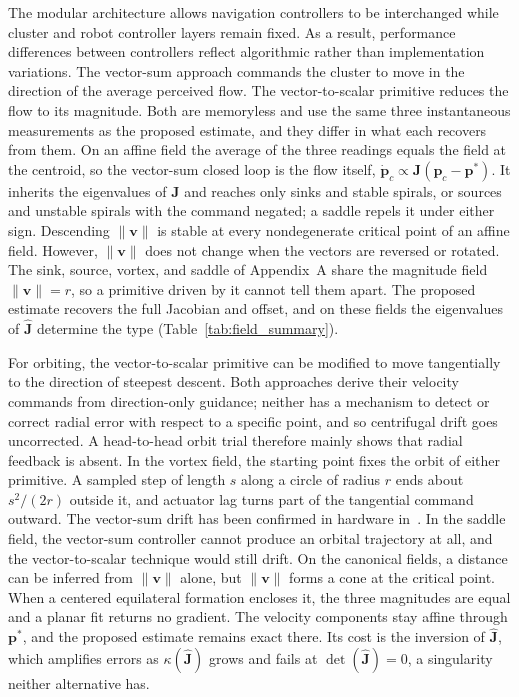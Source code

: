 The modular architecture allows navigation controllers to be interchanged while cluster and robot controller layers remain fixed. As a result, performance differences between controllers reflect algorithmic rather than implementation variations. The vector-sum approach commands the cluster to move in the direction of the average perceived flow. The vector-to-scalar primitive \cite{48} reduces the flow to its magnitude. Both are memoryless and use the same three instantaneous measurements as the proposed estimate, and they differ in what each recovers from them. On an affine field the average of the three readings equals the field at the centroid, so the vector-sum closed loop is the flow itself, $\dot{\mathbf{p}}_c \propto \mathbf{J}(\mathbf{p}_c - \mathbf{p}^*)$. It inherits the eigenvalues of $\mathbf{J}$ and reaches only sinks and stable spirals, or sources and unstable spirals with the command negated; a saddle repels it under either sign. Descending $\|\mathbf{v}\|$ is stable at every nondegenerate critical point of an affine field. However, $\|\mathbf{v}\|$ does not change when the vectors are reversed or rotated. The sink, source, vortex, and saddle of Appendix~A share the magnitude field $\|\mathbf{v}\| = r$, so a primitive driven by it cannot tell them apart. The proposed estimate recovers the full Jacobian and offset, and on these fields the eigenvalues of $\hat{\mathbf{J}}$ determine the type (Table~\ref{tab:field_summary}).

For orbiting, the vector-to-scalar primitive can be modified to move tangentially to the direction of steepest descent. Both approaches derive their velocity commands from direction-only guidance; neither has a mechanism to detect or correct radial error with respect to a specific point, and so centrifugal drift goes uncorrected. A head-to-head orbit trial therefore mainly shows that radial feedback is absent. In the vortex field, the starting point fixes the orbit of either primitive. A sampled step of length $s$ along a circle of radius $r$ ends about $s^2/(2r)$ outside it, and actuator lag turns part of the tangential command outward. The vector-sum drift has been confirmed in hardware in~\cite{22}. In the saddle field, the vector-sum controller cannot produce an orbital trajectory at all, and the vector-to-scalar technique would still drift. On the canonical fields, a distance can be inferred from $\|\mathbf{v}\|$ alone, but $\|\mathbf{v}\|$ forms a cone at the critical point. When a centered equilateral formation encloses it, the three magnitudes are equal and a planar fit returns no gradient. The velocity components stay affine through $\mathbf{p}^*$, and the proposed estimate remains exact there. Its cost is the inversion of $\hat{\mathbf{J}}$, which amplifies errors as $\kappa(\hat{\mathbf{J}})$ grows and fails at $\det(\hat{\mathbf{J}}) = 0$, a singularity neither alternative has.
